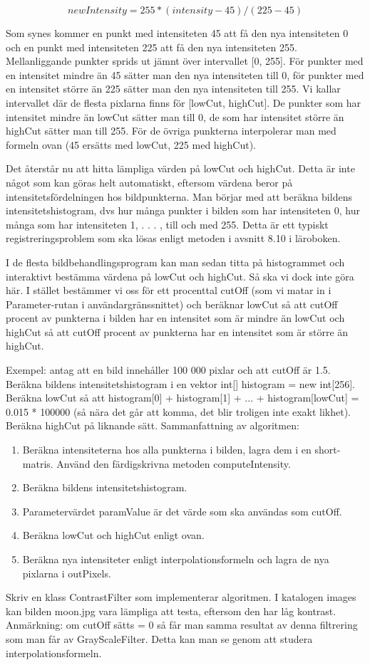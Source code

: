 $$newIntensity = 255 * (intensity - 45) / (225 - 45)$$

Som synes kommer en punkt med intensiteten 45 att få den nya intensiteten 0 och en punkt med intensiteten 225 att få den nya intensiteten 255. Mellanliggande punkter sprids ut jämnt över intervallet [0, 255]. För punkter med en intensitet mindre än 45 sätter man den nya intensiteten till 0, för punkter med en intensitet större än 225 sätter man den nya intensiteten till 255. Vi kallar intervallet där de flesta pixlarna finns för [lowCut, highCut]. De punkter som har intensitet mindre än lowCut sätter man till 0, de som har intensitet större än highCut sätter man till 255. För de övriga punkterna interpolerar man med formeln ovan (45 ersätts med lowCut, 225 med highCut).

Det återstår nu att hitta lämpliga värden på lowCut och highCut. Detta är inte något som kan göras helt automatiskt, eftersom värdena beror på intensitetsfördelningen hos bildpunkterna. Man börjar med att beräkna bildens intensitetshistogram, dvs hur många punkter i bilden som har intensiteten 0, hur många som har intensiteten 1, . . . , till och med 255. Detta är ett typiskt registreringsproblem som ska lösas enligt metoden i avsnitt 8.10 i läroboken. %

I de flesta bildbehandlingsprogram kan man sedan titta på histogrammet och interaktivt bestämma värdena på lowCut och highCut. Så ska vi dock inte göra här. I stället bestämmer vi oss för ett procenttal cutOff (som vi matar in i Parameter-rutan i användargränssnittet) och beräknar lowCut så att cutOff procent av punkterna i bilden har en intensitet som är mindre än lowCut och highCut så att cutOff procent av punkterna har en intensitet som är större än highCut.

Exempel: antag att en bild innehåller 100 000 pixlar och att cutOff är 1.5. Beräkna bildens intensitetshistogram i en vektor int[] histogram = new int[256]. Beräkna lowCut så att histogram[0] + histogram[1] + ... + histogram[lowCut] = 0.015 * 100000 (så nära det går att komma, det blir troligen inte exakt likhet). Beräkna highCut på liknande sätt.
Sammanfattning av algoritmen:
\begin{enumerate}
	\item Beräkna intensiteterna hos alla punkterna i bilden, lagra dem i en short-matris. Använd den färdigskrivna metoden computeIntensity.
	\item Beräkna bildens intensitetshistogram.
	\item Parametervärdet paramValue är det värde som ska användas som cutOff.
	\item Beräkna lowCut och highCut enligt ovan.
	\item Beräkna nya intensiteter enligt interpolationsformeln och lagra de nya pixlarna i outPixels.
\end{enumerate}
Skriv en klass ContrastFilter som implementerar algoritmen. I katalogen images kan bilden moon.jpg vara lämpliga att testa, eftersom den har låg kontrast. Anmärkning: om cutOff sätts = 0 så får man samma resultat av denna filtrering som man får av GrayScaleFilter. Detta kan man se genom att studera interpolationsformeln.
